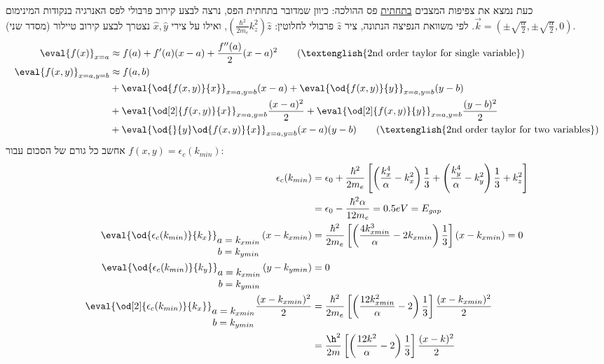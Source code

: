 \documentclass{article}
\begin{document}
\begin{Answer}
כעת נמצא את צפיפות המצבים \underline{בתחתית} פס ההולכה: כיוון שמדובר בתחתית הפס, נרצה לבצע קירוב פרבולי לפס האנרגיה בנקודות המינימום $\vec{k}=\left( \pm\sqrt{\frac{\alpha}{2}},\pm\sqrt{\frac{\alpha}{2}},0 \right)$. לפי משוואת הנפיצה הנתונה, ציר $\hat{z}$ פרבולי לחלוטין: $\left( \frac{\hbar^2}{2m_e}k_{z}^{2} \right)\hat{z}$, ואילו על צירי $\hat{x},\hat{y}$ נצטרך לבצע קירוב טיילור (מסדר שני).
\label{טור טיילור מסדר 2}
\begin{align*}
    \eval{f(x)}_{x=a}&\approx f(a)+f'(a)(x-a)+\frac{f''(a)}{2}(x-a)^2
    \tag{\textenglish{2nd order taylor for single variable}}\\
    \eval{f(x,y)}_{x=a,y=b}&\approx f(a,b)\\
    &+\eval{\od{f(x,y)}{x}}_{x=a,y=b}(x-a)+\eval{\od{f(x,y)}{y}}_{x=a,y=b}(y-b)\\
    &+\eval{\od[2]{f(x,y)}{x}}_{x=a,y=b}\frac{(x-a)^2}{2}+\eval{\od[2]{f(x,y)}{y}}_{x=a,y=b}\frac{(y-b)^2}{2}\\
    &+\eval{\od{}{y}\od{f(x,y)}{x}}_{x=a,y=b}(x-a)(y-b)
    \tag{\textenglish{2nd order taylor for two variables}}
\end{align*}
אחשב כל גורם של הסכום עבור $f(x,y)=\epsilon_{c}(k_{min})$:
\begin{align*}
    \epsilon_{c}(k_{min})&= \epsilon_{0}+\frac{\hbar^2}{2m_{e}}\left[ \left( \frac{k_{x}^4}{\alpha}-k_{x}^2 \right)\frac{1}{3}+\left( \frac{k_{y}^4}{\alpha}-k_{y}^2 \right)\frac{1}{3} + k_{z}^2\right]\\
    &= \epsilon_{0}-\frac{\hbar^2\alpha}{12m_e}=0.5eV=E_{gap}\\
    \eval{\od{\epsilon_{c}(k_{min})}{k_{x}}}_{\begin{matrix}
        a=k_{xmin}\\
        b=k_{ymin}
    \end{matrix}}\left( x-k_{xmin} \right)&= 
    \frac{\hbar^2}{2m_{e}}\left[ \left( \frac{4k_{xmin}^3}{\alpha}-2k_{xmin} \right)\frac{1}{3}\right]\left( x-k_{xmin} \right)=0\\
    \eval{\od{\epsilon_{c}(k_{min})}{k_{y}}}_{\begin{matrix}
        a=k_{xmin}\\
        b=k_{ymin}
    \end{matrix}}\left( y-k_{ymin} \right)&=0\\
    \eval{\od[2]{\epsilon_{c}(k_{min})}{k_{x}}}_{\begin{matrix}
        a=k_{xmin}\\
        b=k_{ymin}
    \end{matrix}}\frac{(x-k_{xmin})^2}{2}&=\frac{\hbar^2}{2m_{e}}\left[ \left( \frac{12k_{xmin}^2}{\alpha}-2\right)\frac{1}{3}\right]\frac{(x-k_{xmin})^2}{2}\\
    &=\frac{\h^2}{2m}\left[ \left( \frac{12k^2}{\alpha}-2\right)\frac{1}{3}\right]\frac{(x-k)^2}{2}
\end{align*}
\end{Answer}
\end{document}
